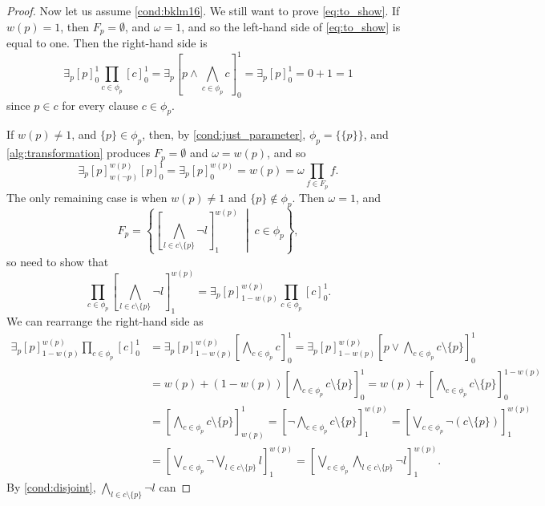 \documentclass[runningheads]{llncs}
\begin{document}
\begin{proof}
  Now let us assume \cref{cond:bklm16}. We still want to prove
  \cref{eq:to_show}. If $w(p) = 1$, then $F_p = \emptyset$, and $\omega = 1$,
  and so the left-hand side of \cref{eq:to_show} is equal to one. Then the
  right-hand side is
  \[
    \exists_p [p]_0^1 \prod_{c \in \phi_p} [c]_0^1 = \exists_p \left[ p \land
      \bigwedge_{c \in \phi_p} c \right]_0^1 = \exists_p [p]_0^1 = 0 + 1 = 1
  \]
  since $p \in c$ for every clause $c \in \phi_p$.

  If $w(p) \ne 1$, and $\{ p \} \in \phi_p$, then, by
  \cref{cond:just_parameter}, $\phi_p = \{ \{ p \} \}$, and
  \cref{alg:transformation} produces $F_p = \emptyset$ and $\omega = w(p)$, and
  so
  \[
    \exists_p [p]_{w(\neg p)}^{w(p)} [p]_0^1 = \exists_p [p]^{w(p)}_0 = w(p) =
    \omega \prod_{f \in F_p} f.
  \]
  The only remaining case is when $w(p) \ne 1$ and $\{ p \} \not \in \phi_p$.
  Then $\omega = 1$, and
  \[
    F_p = \left\{ \left[\bigwedge_{l \in c \setminus \{ p \}} \neg
        l\right]_1^{w(p)} \;\middle|\; c \in \phi_p \right\},
  \]
  so need to show that
  \[
    \prod_{c \in \phi_p} \left[\bigwedge_{l \in c \setminus \{ p \}} \neg
      l\right]_1^{w(p)} = \exists_p [p]_{1-w(p)}^{w(p)} \prod_{c \in \phi_p}
    [c]_0^1.
  \]
  We can rearrange the right-hand side as %
  \begin{align*}
    \exists_p [p]_{1-w(p)}^{w(p)} \prod_{c \in \phi_p} [c]_0^1 &= \exists_p [p]_{1-w(p)}^{w(p)} \left[\bigwedge_{c \in \phi_p} c\right]_0^1 = \exists_p [p]_{1-w(p)}^{w(p)} \left[ p \lor \bigwedge_{c \in \phi_p} c \setminus \{ p \} \right]_0^1 \\
                                                               &= w(p) + (1-w(p)) \left[ \bigwedge_{c \in \phi_p} c \setminus \{ p \} \right]_0^1 = w(p) + \left[ \bigwedge_{c \in \phi_p} c \setminus \{ p \} \right]_0^{1-w(p)} \\
                                                               &= \left[ \bigwedge_{c \in \phi_p} c \setminus \{ p \} \right]_{w(p)}^1 = \left[ \neg \bigwedge_{c \in \phi_p} c \setminus \{ p \} \right]_1^{w(p)} = \left[ \bigvee_{c \in \phi_p} \neg(c \setminus \{ p \}) \right]_1^{w(p)} \\
                                                               &= \left[ \bigvee_{c \in \phi_p} \neg \bigvee_{l \in c \setminus \{ p \}} l \right]_1^{w(p)} = \left[ \bigvee_{c \in \phi_p} \bigwedge_{l \in c \setminus \{ p \}} \neg l \right]_1^{w(p)}.
  \end{align*}
   By \cref{cond:disjoint}, $\bigwedge_{l \in c \setminus \{ p \}} \neg l$ can

\end{proof}
\end{document}
